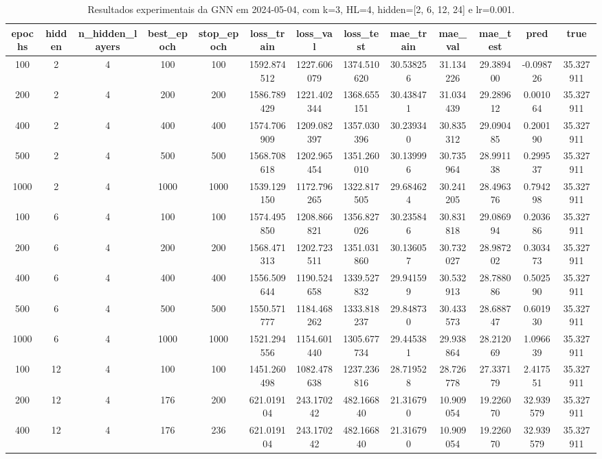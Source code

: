 \begin{table}[h]
\centering
\caption{Resultados experimentais da GNN em 2024-05-04, com k=3, HL=4, hidden=[2, 6, 12, 24] e lr=0.001.}
\label{tab:gnn_results_k3_hl4_d20240504}
\begin{tabular}{ccccccccccccc}
\toprule
epochs & hidden & n\_hidden\_layers & best\_epoch & stop\_epoch & loss\_train & loss\_val & loss\_test & mae\_train & mae\_val & mae\_test & pred & true \\
\midrule
100 & 2 & 4 & 100 & 100 & 1592.874512 & 1227.606079 & 1374.510620 & 30.538256 & 31.134226 & 29.389400 & -0.098726 & 35.327911 \\
200 & 2 & 4 & 200 & 200 & 1586.789429 & 1221.402344 & 1368.655151 & 30.438471 & 31.034439 & 29.289612 & 0.001064 & 35.327911 \\
400 & 2 & 4 & 400 & 400 & 1574.706909 & 1209.082397 & 1357.030396 & 30.239340 & 30.835312 & 29.090485 & 0.200190 & 35.327911 \\
500 & 2 & 4 & 500 & 500 & 1568.708618 & 1202.965454 & 1351.260010 & 30.139996 & 30.735964 & 28.991138 & 0.299537 & 35.327911 \\
1000 & 2 & 4 & 1000 & 1000 & 1539.129150 & 1172.796265 & 1322.817505 & 29.684624 & 30.241205 & 28.496376 & 0.794298 & 35.327911 \\
100 & 6 & 4 & 100 & 100 & 1574.495850 & 1208.866821 & 1356.827026 & 30.235846 & 30.831818 & 29.086994 & 0.203686 & 35.327911 \\
200 & 6 & 4 & 200 & 200 & 1568.471313 & 1202.723511 & 1351.031860 & 30.136057 & 30.732027 & 28.987202 & 0.303473 & 35.327911 \\
400 & 6 & 4 & 400 & 400 & 1556.509644 & 1190.524658 & 1339.527832 & 29.941599 & 30.532913 & 28.788086 & 0.502590 & 35.327911 \\
500 & 6 & 4 & 500 & 500 & 1550.571777 & 1184.468262 & 1333.818237 & 29.848730 & 30.433573 & 28.688747 & 0.601930 & 35.327911 \\
1000 & 6 & 4 & 1000 & 1000 & 1521.294556 & 1154.601440 & 1305.677734 & 29.445381 & 29.938864 & 28.212069 & 1.096639 & 35.327911 \\
100 & 12 & 4 & 100 & 100 & 1451.260498 & 1082.478638 & 1237.236816 & 28.719528 & 28.726778 & 27.337179 & 2.417551 & 35.327911 \\
200 & 12 & 4 & 176 & 200 & 621.019104 & 243.170242 & 482.166840 & 21.316790 & 10.909054 & 19.226070 & 32.939579 & 35.327911 \\
400 & 12 & 4 & 176 & 236 & 621.019104 & 243.170242 & 482.166840 & 21.316790 & 10.909054 & 19.226070 & 32.939579 & 35.327911 \\

\end{tabular}
\end{table}
